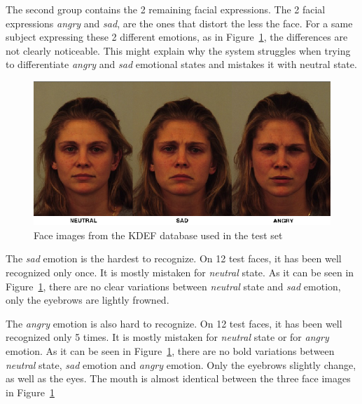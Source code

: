 \noindent The second group contains the 2 remaining facial expressions. The 2 facial expressions \textit{angry} and \textit{sad}, are the ones that distort the less the face. For a same subject expressing these 2 different emotions, as in Figure~\ref{kdef_no_difference_emotions}, the differences are not clearly noticeable. This might explain why the system struggles when trying to differentiate \textit{angry} and \textit{sad} emotional states and mistakes it with neutral state.
\newline

\begin{figure}[!h]
\begin{center}
\noindent \includegraphics[scale=0.3]{figures/kdef_no_difference_emotions} 
\newline
\caption{Face images from the KDEF database used in the test set}
\label{kdef_no_difference_emotions}
\end{center} 
\end{figure}

\noindent The \textit{sad} emotion is the hardest to recognize. On 12 test faces, it has been well recognized only once. It is mostly mistaken for \textit{neutral} state. As it can be seen in Figure~\ref{kdef_no_difference_emotions}, there are no clear variations between \textit{neutral} state and \textit{sad} emotion, only the eyebrows are lightly frowned.
\newline

\noindent The \textit{angry} emotion is also hard to recognize. On 12 test faces, it has been well recognized only 5 times. It is mostly mistaken for \textit{neutral} state or for \textit{angry} emotion. As it can be seen in Figure~\ref{kdef_no_difference_emotions}, there are no bold variations between \textit{neutral} state, \textit{sad} emotion and \textit{angry} emotion. Only the eyebrows slightly change, as well as the eyes. The mouth is almost identical between the three face images in Figure~\ref{kdef_no_difference_emotions}

